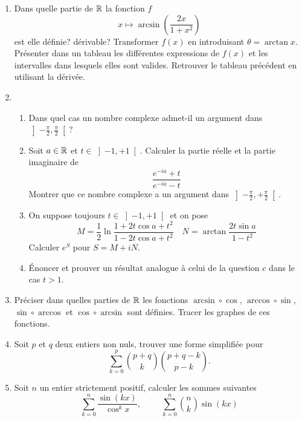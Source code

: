 \begin{enumerate}

\item  Dans quelle partie de $\mathbb{R}$ la fonction $f$
\begin{displaymath}
 x \mapsto \arcsin (\frac{2x}{1+x^{2}})
\end{displaymath}
est elle définie? dérivable?\newline
Transformer $f(x)$ en introduisant $\theta = \arctan x$. Présenter dans un tableau les différentes expressions de $f(x)$ et les intervalles dans lesquels elles sont valides.\newline
Retrouver le tableau précédent en utilisant la dérivée.

\item
\begin{enumerate}
\item Dans quel cas un nombre complexe admet-il un argument dans $\left] -\frac{\pi}{2}, \frac{\pi}{2}\right[$? 
\item  Soit $a \in \mathbb{R}$ et $t \in \left]-1,+1\right[ $. Calculer la partie réelle et la partie imaginaire de
\[\frac{e^{-ia}+t}{e^{-ia}-t}\]
Montrer que ce nombre complexe a un argument dans $\left] -\frac{\pi }{2},+ \frac{\pi }{2}\right[ $.
\item  On suppose toujours $t\in \left] -1,+1\right[ $ et on pose
\[M=\frac{1}{2}\ln \frac{1+2t\cos a+t^{2}}{1-2t\cos a+t^{2}}\quad N=\arctan
\frac{2t\sin a}{1-t^{2}}\]
Calculer $e^{S}$ pour $S=M+ i N$.
\item \'Enoncer et prouver un résultat analogue à celui de la question $c$ dans le cas $t>1$.
\end{enumerate}

\item Préciser dans quelles parties de $\mathbb{R}$ les fonctions $\arcsin \circ \cos$, $\arccos \circ \sin$, $\sin \circ \arccos$ et $\cos \circ \arcsin$ sont définies. Tracer les graphes de ces fonctions.


\item Soit $p$ et $q$ deux entiers non nuls, trouver une forme simplifi{\'e}e pour
\begin{displaymath}
 \sum _{k=0}^{p}\binom{p+q}{k} \binom{p+q-k}{p-k}.
\end{displaymath}


\item Soit $n$ un entier strictement positif, calculer les sommes suivantes
\begin{displaymath}
\sum _{k=0}^{n}\frac{\sin(kx)}{\cos^{k}x},\hspace{1cm}
\sum _{k=0}^{n}\binom{n}{k}\sin(kx)
\end{displaymath}

\end{enumerate}
